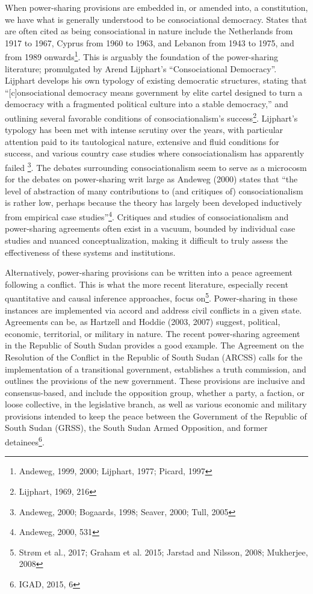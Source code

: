 \documentclass[12pt]{article}
\begin{document}
When power-sharing provisions are embedded in, or amended into, a constitution, we have what is generally understood to be consociational democracy. States that are often cited as being consociational in nature include the Netherlands from 1917 to 1967, Cyprus from 1960 to 1963, and Lebanon from 1943 to 1975, and from 1989 onwards\footnote{Andeweg, 1999, 2000; Lijphart, 1977; Picard, 1997}. This is arguably the foundation of the power-sharing literature; promulgated by Arend Lijphart’s “Consociational Democracy”. Lijphart develops his own typology of existing democratic structures, stating that “[c]onsociational democracy means government by elite cartel designed to turn a democracy with a fragmented political culture into a stable democracy,” and outlining several favorable conditions of consociationalism’s success\footnote{Lijphart, 1969, 216}. Lijphart’s typology has been met with intense scrutiny over the years, with particular attention paid to its tautological nature, extensive and fluid conditions for success, and various country case studies where consociationalism has apparently failed \footnote{Andeweg, 2000; Bogaards, 1998; Seaver, 2000; Tull, 2005}. The debates surrounding consociationalism seem to serve as a 
microcosm for the debates on power-sharing writ large as Andeweg (2000) states that “the level of abstraction of many contributions to (and critiques of) consociationalism is rather low, perhaps because the theory has largely been developed inductively from empirical case studies”\footnote{Andeweg, 2000, 531}. Critiques and studies of consociationalism and power-sharing agreements often exist in a vacuum, bounded by individual case studies and nuanced conceptualization, making it difficult to truly assess the effectiveness of these systems and institutions.    

Alternatively, power-sharing provisions can be written into a peace agreement following a conflict. This is what the more recent literature, especially recent quantitative and causal inference approaches, focus on\footnote{Strøm et al., 2017; Graham et al. 2015; Jarstad and Nilsson, 2008; Mukherjee, 2008}. Power-sharing in these instances are implemented via accord and address civil conflicts in a given state. Agreements can be, as Hartzell and Hoddie (2003, 2007) suggest, political, economic, territorial, or military in nature. The recent power-sharing agreement in the Republic of South Sudan provides a good example. The Agreement on the Resolution of the Conflict in the Republic of South Sudan (ARCSS) calls for the implementation of a transitional government, establishes a truth commission, and outlines the provisions of the new government. These provisions are inclusive and consensus-based, and include the opposition group, whether a party, a faction, or loose collective, in the legislative branch, as well as various economic and military provisions intended to keep the peace between the Government of the Republic of South Sudan (GRSS), the South Sudan Armed Opposition, and former detainees\footnote{IGAD, 2015, 6}. 
\end{document}

